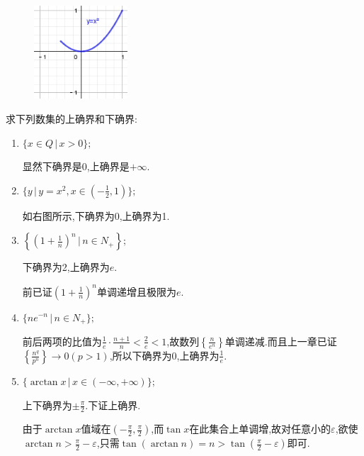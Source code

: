      \begin{figure}
         \includegraphics[width=3.5cm]{Picture/3.1/图一.png}
         \caption{}
     \end{figure}
     \begin{exercise}
         求下列数集的上确界和下确界:
         \begin{enumerate}
             \item $\{x\in Q\,\lvert\, x>0\};$
                   \begin{solution}
                       显然下确界是0,上确界是$+\infty$.
                   \end{solution}
             \item $\{y\,\lvert\, y=x^2,x\in(-\frac{1}{2},1)\};$
                   \begin{solution}
                       如右图所示,下确界为0,上确界为1.
                   \end{solution}
             \item $\left\{\left(1+\frac{1}{n}\right)^n \,\bigg\lvert\, n\in N_+\right\};$
                   \begin{solution}
                       下确界为2,上确界为$e$.

                       前已证$\left(1+\frac{1}{n}\right)^n$单调递增且极限为$e$.
                   \end{solution}
             \item $\{ne^{-n}\,\lvert\, n\in N_+\};$
                   \begin{solution}
                       前后两项的比值为$\frac{1}{e}\cdot\frac{n+1}{n}<\frac{2}{e}<1$,故数列$\left\{\frac{n}{e^n}\right\}$单调递减.而且上一章已证$\left\{\frac{n^q}{p^n}\right\}\to 0(p>1)$,所以下确界为0,上确界为$\frac{1}{e}$.
                   \end{solution}
             \item $\{\arctan x \,\lvert\, x\in (-\infty,+\infty)\};$
                   \begin{solution}
                       上下确界为$\pm \frac{\pi}{2}$.下证上确界.

                       由于$\arctan x$值域在$\left(-\frac{\pi}{2},\frac{\pi}{2}\right)$,而$\tan x$在此集合上单调增,故对任意小的$\varepsilon$,欲使$\arctan n>\frac{\pi}{2}-\varepsilon$,只需$\tan(\arctan n)=n>\tan\left(\frac{\pi}{2}-\varepsilon\right)$即可.


\end{solution}
\end{enumerate}
\end{exercise}
